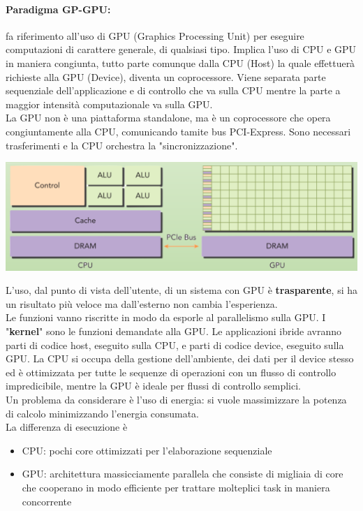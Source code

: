 \paragraph{Paradigma GP-GPU:} fa riferimento all'uso di GPU (Graphics Processing Unit) per eseguire computazioni di carattere generale, di qualsiasi tipo. Implica l'uso di CPU e GPU in maniera congiunta, tutto parte comunque dalla CPU (Host) la quale effettuerà richieste alla GPU (Device), diventa un coprocessore. Viene separata parte sequenziale dell'applicazione e di controllo che va sulla CPU mentre la parte a maggior intensità computazionale va sulla GPU.\\
La GPU non è una piattaforma standalone, ma è un coprocessore che opera congiuntamente alla CPU, comunicando tamite bus PCI-Express. Sono necessari trasferimenti e la CPU orchestra la "sincronizzazione".
\begin{center}
	\includegraphics[width=0.95\linewidth]{img/intro/gpgpu1}
\end{center}

L'uso, dal punto di vista dell'utente, di un sistema con GPU è \textbf{trasparente}, si ha un risultato più veloce ma dall'esterno non cambia l'esperienza.\\

Le funzioni vanno riscritte in modo da esporle al parallelismo sulla GPU. I "\textbf{kernel}" sono le funzioni demandate alla GPU.  Le applicazioni ibride avranno parti di codice host, eseguito sulla CPU, e parti di codice device, eseguito sulla GPU. La CPU si occupa della gestione dell'ambiente, dei dati per il device stesso ed è ottimizzata per tutte le sequenze di operazioni con un flusso di controllo impredicibile, mentre la GPU è ideale per flussi di controllo semplici.\\

Un problema da considerare è l'uso di energia: si vuole massimizzare la potenza di calcolo minimizzando l'energia consumata.\\

La differenza di esecuzione è
\begin{itemize}
	\item CPU: pochi core ottimizzati per l'elaborazione sequenziale
	\item GPU: architettura massicciamente parallela che consiste di migliaia di core che cooperano in modo efficiente per trattare molteplici task in maniera concorrente
\end{itemize}

